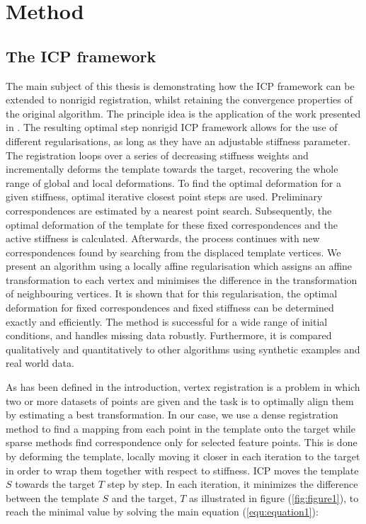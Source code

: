 \documentclass[../structure.tex]{subfiles}
\begin{document}
\chapter{Method}
\section{The ICP framework}
\hspace{2em}The main subject of this thesis is demonstrating how the ICP framework can be extended to nonrigid registration, whilst retaining the convergence properties of the original algorithm. The principle idea is the application of the work presented in \cite{Amberg2007}. The resulting optimal step nonrigid ICP framework allows for the use of different regularisations, as long as they have an adjustable stiffness parameter. The registration loops over a series of decreasing stiffness weights and incrementally deforms the template towards the target, recovering the whole range of global and local deformations. To find the optimal deformation for a given stiffness, optimal iterative closest point steps are used. Preliminary correspondences are estimated by a nearest point search. Subsequently, the optimal deformation of the template for these fixed correspondences and the active stiffness is calculated. Afterwards, the process continues with new correspondences found by searching from the displaced template vertices. We present an algorithm using a locally affine regularisation which assigns an affine transformation to each vertex and minimises the difference in the transformation of neighbouring vertices. It is shown that for this regularisation, the optimal deformation for fixed correspondences and fixed stiffness can be determined exactly and efficiently. The method is successful for a wide range of initial conditions, and handles missing data robustly. Furthermore, it is compared qualitatively and quantitatively to other algorithms using synthetic examples and real world data.

\hspace{2em} As has been defined in the introduction, vertex registration is a problem in which two or more datasets of points are given and the task is to optimally align them by estimating a best transformation. In our case, we use a dense registration method to find a mapping from each point in the template onto the target while sparse methods find correspondence only for selected feature points. This is done by deforming the template, locally moving it closer in each iteration to the target in order to wrap them together with respect to stiffness.
\hspace{2em}ICP moves the template $S$ towards the target $T$ step by step. In each iteration, it minimizes the difference between the template $S$ and the target, $T$ as illustrated in figure (\ref{fig:figure1}), to reach the minimal value by solving the main equation (\ref{equ:equation1}):
\end{document}
